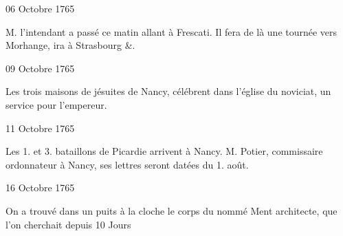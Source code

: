                     \begin{diary}{06 Octobre 1765}{}
                        
                        
                           M. l'intendant a passé ce matin
                           allant
                           à Frescati. Il fera de là une
                           tournée
                           vers Morhange, ira à
                              Strasbourg &. \bigskip
        
        
                     \end{diary}

                     \begin{diary}{09 Octobre 1765}{}
                        
                         Les trois maisons de jésuites de
                              Nancy, célébrent
                           dans l’église du
                              noviciat, un
                           service pour l'empereur.
                        \bigskip
        
        
                     \end{diary}

                     \begin{diary}{11 Octobre 1765}{}
                        
                        
                           Les 1. et
                                 3.
                              bataillons de Picardie arrivent à Nancy.
                           M. Potier, commissaire ordonnateur à
                              Nancy, ses lettres
                           seront datées du 1.
                              août. \bigskip
        
        
                     \end{diary}

                     \begin{diary}{16 Octobre 1765}{}
                        
                         On a trouvé dans un puits à la
                              cloche le corps du
                           nommé Ment architecte, que l'on cherchait depuis 10
                           Jours \bigskip
        
        
                     \end{diary}

